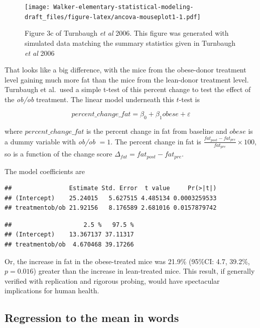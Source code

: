 \documentclass[]{book}
\begin{document}
\begin{figure}
\centering
\texttt{[image: Walker-elementary-statistical-modeling-draft\_files/figure-latex/ancova-mouseplot1-1.pdf]}
\caption{\label{fig:ancova-mouseplot1}Figure 3c of Turnbaugh \emph{et al} 2006. This figure was generated with simulated data matching the summary statistics given in Turnbaugh \emph{et al} 2006}
\end{figure}

That looks like a big difference, with the mice from the obese-donor treatment level gaining much more fat than the mice from the lean-donor treatment level. Turnbaugh et al.~used a simple t-test of this percent change to test the effect of the \emph{ob/ob} treatment. The linear model underneath this \(t\)-test is

\begin{equation}
percent\_change\_fat = \beta_0 + \beta_1 obese + \varepsilon
\end{equation}

where \(percent\_change\_fat\) is the percent change in fat from baseline and \(obese\) is a dummy variable with \emph{ob/ob} \(= 1\). The percent change in fat is \(\frac{fat_{post} - fat_{pre}}{fat_{pre}} \times 100\), so is a function of the change score \(\Delta_{fat} = fat_{post} - fat_{pre}\).

The model coefficients are

\begin{verbatim}
##                Estimate Std. Error  t value     Pr(>|t|)
## (Intercept)    25.24015   5.627515 4.485134 0.0003259533
## treatmentob/ob 21.92156   8.176589 2.681016 0.0157879742
\end{verbatim}

\begin{verbatim}
##                    2.5 %   97.5 %
## (Intercept)    13.367137 37.11317
## treatmentob/ob  4.670468 39.17266
\end{verbatim}

Or, the increase in fat in the obese-treated mice was 21.9\% (95\%CI: 4.7, 39.2\%, \(p=0.016\)) greater than the increase in lean-treated mice. This result, if generally verified with replication and rigorous probing, would have spectacular implications for human health.

\hypertarget{regression-to-the-mean-in-words}{%
\subsection{Regression to the mean in words}\label{regression-to-the-mean-in-words}}
\end{document}
